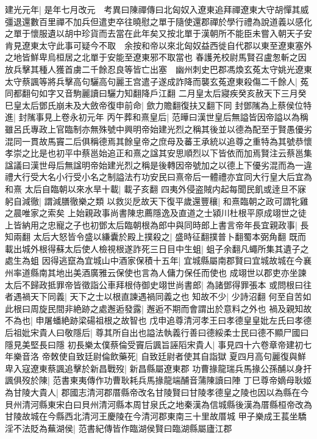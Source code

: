建光元年|{
	是年七月改元　考異曰陳禪傳曰北匈奴入遼東追拜禪遼東大守胡憚其威彊退還數百里禪不加兵但遣吏卒往曉慰之單于隨使還郡禪於學行禮為說道義以感化之單于懷服遺以胡中珍貨而去當在此年矣又按北單于漢朝所不能臣未嘗入朝天子安肯見遼東太守此事可疑今不取　余按和帝以來北匈奴益西徙自代郡以東至遼東塞外之地皆鮮卑烏桓居之北單于安能至遼東邪不取當也}
春護羌校尉馬賢召盧怱斬之因放兵擊其種人獲首虜二千餘忍良等皆亡出塞　幽州刺史巴郡馮煥玄菟太守姚光遼東太守蔡諷等將兵擊高句驪高句麗王宫遣子遂成詐降而襲玄菟遼東殺傷二千餘人|{
	菟同都翻句如字又音駒麗讀曰驪力知翻降戶江翻}
二月皇太后寢疾癸亥赦天下三月癸巳皇太后鄧氏崩未及大斂帝復申前命|{
	歛力贍翻復扶又翻下同}
封鄧隲為上蔡侯位特進|{
	封隲事見上卷永初元年}
丙午葬和熹皇后|{
	范曄曰漢世皇后無謚皆因帝謚以為稱雖呂氏專政上官臨制亦無殊號中興明帝始建光烈之稱其後並以德為配至于賢愚優劣混同一貫故馬竇二后俱稱德焉其餘皇帝之庶母及蕃王承統以追尊之重特為其號恭懷孝崇之比是也初平中蔡邕始追正和熹之諡其安思順烈以下皆依而加焉賢注云蔡邕集諡議曰漢世母后無諡明帝始建光烈之稱是後轉因帝號加之以德上下優劣混而為一違禮大行受大名小行受小名之制謚法冇功安民曰熹帝后一體禮亦宜同大行皇大后宜為和熹}
太后自臨朝以來水旱十載|{
	載子亥翻}
四夷外侵盗賊内起每聞民飢或逹旦不寐躬自減徹|{
	謂減膳徹樂之類}
以救災戹故天下復平歲還豐穰|{
	和熹臨朝之政可謂牝雞之晨唯家之索矣}
上始親政事尚書陳忠薦隱逸及直道之士潁川杜根平原成翊世之徒上皆納用之忠寵之子也初鄧太后臨朝根為郎中與同時郎上書言帝年長宜親政事|{
	長知兩翻}
太后大怒皆令盛以縑囊於殿上撲殺之|{
	盛時征翻撲普卜翻蜀本弼角翻}
既而載出城外根得蘇太后使人檢視根遂詐死三日目中生蛆|{
	蛆子余翻凡蠅所集其遺子之處生為蛆}
因得逃竄為宜城山中酒家保積十五年|{
	宜城縣屬南郡賢曰宜城故城在今襄州率道縣南其地出美酒廣雅云保使也言為人傭力保任而使也}
成翊世以郡吏亦坐諫太后不歸政抵罪帝皆徵詣公車拜根侍御史翊世尚書郎|{
	為諸鄧得罪張本}
或問根曰往者遇禍天下同義|{
	天下之士以根直諫遇禍同義之也}
知故不少|{
	少詩沼翻}
何至自苦如此根曰周旋民間非絶跡之處邂逅發露|{
	邂逅不期而會謂出於意料之外也}
禍及親知故不為也|{
	申屠蟠絶跡梁碭祖根之故智也}
戊申追尊清河孝王曰孝德皇皇妣左氏曰孝德后祖妣宋貴人曰敬隱后|{
	尊其所自出也謚法執義行善曰德綏柔士民曰德不顯尸國曰隱見美堅長曰隱}
初長樂太僕蔡倫受竇后諷旨誣䧟宋貴人|{
	事見四十六卷章帝建初七年樂音洛}
帝敇使自致廷尉倫飲藥死|{
	自致廷尉者使其自詣獄}
夏四月高句麗復與鮮卑入寇遼東蔡諷追擊於新昌戰歿|{
	新昌縣屬遼東郡}
功曹掾龍瑞兵馬掾公孫酺以身扞諷俱歿於陳|{
	范書東夷傳作功曹耿耗兵馬掾龍端酺音蒲陳讀曰陣}
丁巳尊帝嫡母耿姬為甘陵大貴人|{
	郡國志清河郡厝縣帝改名甘陵賢曰甘陵孝德皇之陵也因以為縣在今貝州清河縣東宋白曰貝州清河縣本周甘泉氏之地秦漢為信城縣後漢為厝縣桓帝改為甘陵故城在今縣西北清河王慶陵在今清河郡東南三十里故厝城}
甲子樂成王萇坐驕淫不法貶為蕪湖侯|{
	范書紀傳皆作臨湖侯賢曰臨湖縣屬廬江郡}
